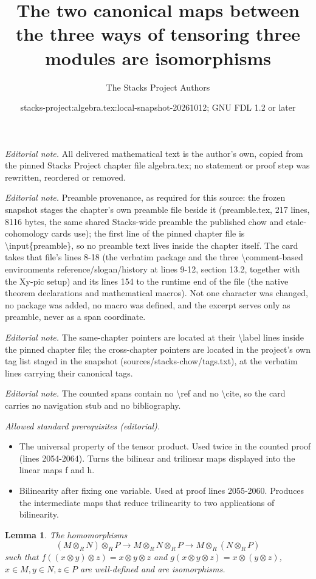 \documentclass[10pt,a4paper]{amsart}
\title{The two canonical maps between the three ways of tensoring three modules are isomorphisms}
\author{The Stacks Project Authors}
\date{stacks-project:algebra.tex:local-snapshot-20261012; GNU FDL 1.2 or later}
\theoremstyle{plain}
\newtheorem{lemma}[subsection]{Lemma}
\theoremstyle{definition}
\theoremstyle{remark}
\numberwithin{equation}{subsection}
\begin{document}
\maketitle
\noindent\textit{Editorial note.} All delivered mathematical text is the author's own, copied from the pinned Stacks Project chapter file algebra.tex; no statement or proof step was rewritten, reordered or removed.\par\medskip
\noindent\textit{Editorial note.} Preamble provenance, as required for this source: the frozen snapshot stages the chapter's own preamble file beside it (preamble.tex, 217 lines, 8116 bytes, the same shared Stacks-wide preamble the published chow and etale-cohomology cards use); the first line of the pinned chapter file is \textbackslash{}input\{preamble\}, so no preamble text lives inside the chapter itself. The card takes that file's lines 8-18 (the verbatim package and the three \textbackslash{}comment-based environments reference/slogan/history at lines 9-12, section 13.2, together with the Xy-pic setup) and its lines 154 to the runtime end of the file (the native theorem declarations and mathematical macros). Not one character was changed, no package was added, no macro was defined, and the excerpt serves only as preamble, never as a span coordinate.\par\medskip
\noindent\textit{Editorial note.} The same-chapter pointers are located at their \textbackslash{}label lines inside the pinned chapter file; the cross-chapter pointers are located in the project's own tag list staged in the snapshot (sources/stacks-chow/tags.txt), at the verbatim lines carrying their canonical tags.\par\medskip
\noindent\textit{Editorial note.} The counted spans contain no \textbackslash{}ref and no \textbackslash{}cite, so the card carries no navigation stub and no bibliography.\par\medskip
\noindent\textit{Allowed standard prerequisites (editorial).}\begin{itemize}
\item The universal property of the tensor product. Used twice in the counted proof (lines 2054-2064). Turns the bilinear and trilinear maps displayed into the linear maps f and h.
\item Bilinearity after fixing one variable. Used at proof lines 2055-2060. Produces the intermediate maps that reduce trilinearity to two applications of bilinearity.
\end{itemize}\medskip
\begin{lemma}
\label{lemma-transitive}
The homomorphisms
$$
(M \otimes_R N)\otimes_R P \to
M \otimes_R N \otimes_R P \to
M \otimes_R (N \otimes_R P)
$$
such that
$f((x \otimes y)\otimes z) = x \otimes y \otimes z$
and $g(x \otimes y \otimes z) = x \otimes (y \otimes z)$,
$x\in M, y\in N, z\in P$ are well-defined and are isomorphisms.
\end{lemma}
\end{document}
